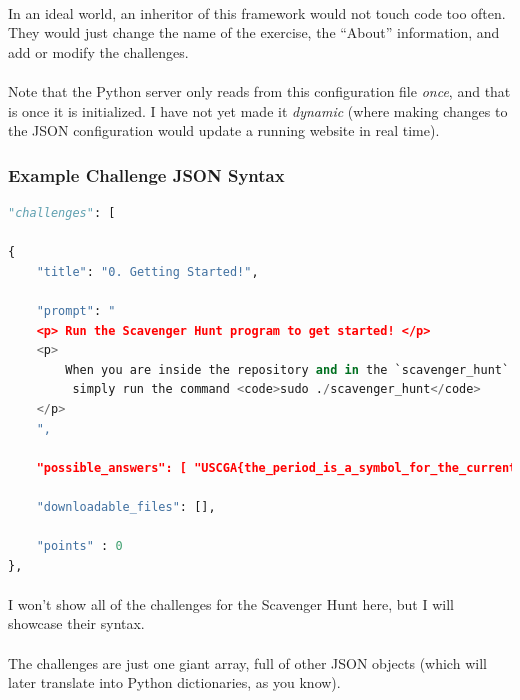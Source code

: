 \documentclass[11pt]{article}
\begin{document}
	\paragraph{} In an ideal world, an inheritor of this framework would not touch code too often. They would just change the name of the exercise, the ``About'' information, and add or modify the challenges.

	\paragraph{} Note that the Python server only reads from this configuration file \textit{once}, and that is once it is initialized. I have not yet made it \textit{dynamic} (where making changes to the JSON configuration would update a running website in real time).

	\newpage

	\subsubsection{Example Challenge JSON Syntax}

\begin{lstlisting}[language=python]
"challenges": [

{ 
	"title": "0. Getting Started!",

	"prompt": "
	<p> Run the Scavenger Hunt program to get started! </p>
	<p>
		When you are inside the repository and in the `scavenger_hunt` directory,
		 simply run the command <code>sudo ./scavenger_hunt</code>
	</p>
	",

	"possible_answers": [ "USCGA{the_period_is_a_symbol_for_the_current_directory}" ],
	
	"downloadable_files": [],

	"points" : 0
},
\end{lstlisting}	

	\paragraph{} I won't show all of the challenges for the Scavenger Hunt here, but I will showcase their syntax.

	\paragraph{} The challenges are just one giant array, full of other JSON objects (which will later translate into Python dictionaries, as you know). 
\end{document}
